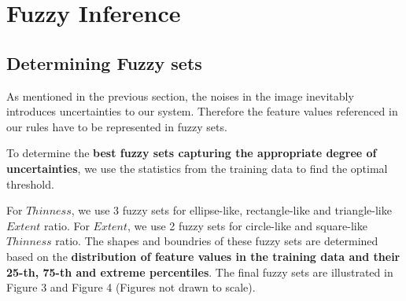 \section{Fuzzy Inference}

\subsection{Determining Fuzzy sets}

As mentioned in the previous section, the noises in the image inevitably introduces uncertainties to our system. Therefore the feature values referenced in our rules have to be represented in fuzzy sets.

To determine the \textbf{best fuzzy sets capturing the appropriate degree of uncertainties}, we use the statistics from the training data to find the optimal threshold.

For $Thinness$, we use 3 fuzzy sets for ellipse-like, rectangle-like and triangle-like $Extent$ ratio. For $Extent$, we use 2 fuzzy sets for circle-like and square-like $Thinness$ ratio. The shapes and boundries of these fuzzy sets are determined based on the \textbf{distribution of feature values in the training data and their 25-th, 75-th and extreme percentiles}. The final fuzzy sets are illustrated in Figure 3 and Figure 4 (Figures not drawn to scale).


